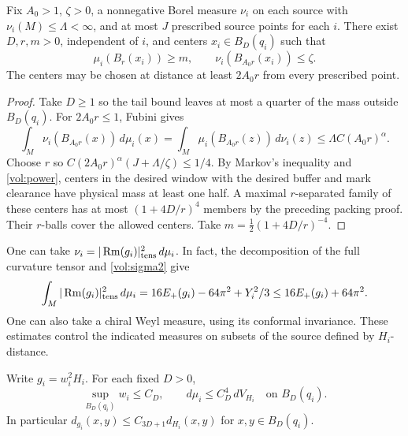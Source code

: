 \begin{corollary}
\label{vol:protected}
Fix \(A_0>1\), \(\zeta>0\), a nonnegative Borel measure \(\nu_i\) on
each source with \(\nu_i(M)\leq\Lambda<\infty\), and at most \(J\)
prescribed source points for each \(i\).
There exist \(D,r,m>0\), independent of \(i\), and centers
\(x_i\in B_D(q_i)\) such that
\[
 \mu_i(B_r(x_i))\geq m,\qquad
 \nu_i(B_{A_0r}(x_i))\leq\zeta .
\]
The centers may be chosen at distance at least \(2A_0r\) from every
prescribed point.
\end{corollary}

\begin{proof}
Take \(D\geq1\) so the tail bound leaves at most a quarter of the
mass outside \(B_D(q_i)\). For \(2A_0r\leq1\), Fubini gives
\[
 \int_M \nu_i(B_{A_0r}(x))\,d\mu_i(x)
 =\int_M\mu_i(B_{A_0r}(z))\,d\nu_i(z)
 \leq\Lambda C(A_0r)^\alpha .
\]
Choose \(r\) so \(C(2A_0r)^\alpha(J+\Lambda/\zeta)\leq1/4\).
By Markov's inequality and \eqref{vol:power}, centers in the desired
window with the desired buffer and mark clearance have physical
mass at least one half. A maximal \(r\)-separated family of these
centers has at most \((1+4D/r)^4\) members by the preceding
packing proof. Their \(r\)-balls cover the allowed centers.
Take \(m=\tfrac12(1+4D/r)^{-4}\).
\end{proof}

One can take \(\nu_i=|\operatorname{Rm}(g_i)|_{\rm tens}^2\,d\mu_i\).
In fact, the decomposition of the full curvature tensor and
\eqref{vol:sigma2} give
\[
 \int_M|\operatorname{Rm}(g_i)|_{\rm tens}^2\,d\mu_i
 =16E_+(g_i)-64\pi^2+Y_i^2/3\leq16E_+(g_i)+64\pi^2 .
\]
One can also take a chiral Weyl measure, using its conformal
invariance. These estimates control the indicated measures on
subsets of the source defined by \(H_i\)-distance.

\begin{proposition}
\label{vol:bounded-factor}
Write \(g_i=w_i^2H_i\). For each fixed \(D>0\),
\begin{equation}
 \sup_{B_D(q_i)} w_i\leq C_D,\qquad
 d\mu_i\leq C_D^4\,dV_{H_i}\quad\text{on }B_D(q_i).
 \label{vol:factor-bound}
\end{equation}
In particular \(d_{g_i}(x,y)\leq C_{3D+1}d_{H_i}(x,y)\) for
\(x,y\in B_D(q_i)\).
\end{proposition}

